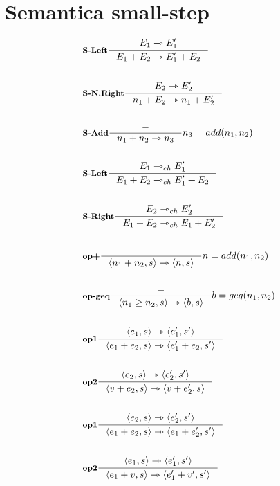 \documentclass[a4paper, 10pt]{article}
\newcommand{\infer}[4]{\inference[\textbf{#1}]{#2}{#3}#4 \\}
\newcommand{\srule}[2]{\langle #1 \rangle \rightarrowtriangle \langle #2 \rangle}
\newcommand{\goesto}{\rightarrowtriangle}
\begin{document}
\section*{Semantica small-step}
\begin{multicols}{2}
	\begin{align*}
		&\infer{S-Left}{E_1 \goesto E_1' }{E_1 + E_2 \goesto E_1' + E_2}{} \\
		&\infer{S-N.Right}{E_2 \goesto E_2'}{n_1 + E_2 \goesto n_1 + E_2'}{} \\
		&\infer{S-Add}{-}{n_1+n_2 \goesto n_3}{n_3 = add(n_1, n_2)} \\
		&\infer{S-Left}{E_1 \goesto_{ch} E_1'}{E_1 + E_2 \goesto_{ch} E_1' + E_2}{}\\
		&\infer{S-Right}{E_2 \goesto_{ch} E_2'}{E_1 + E_2 \goesto_{ch} E_1 + E_2'}{}\\
		&\infer{op+}{-}{\srule{n_1 + n_2,s}{n,s}}{n=add(n_1,n_2)}\\
		&\infer{op-geq}{-}{\srule{n_1 \geq n_2,s}{b,s}}{b=geq(n_1, n_2)} \\
		&\infer{op1}{\srule{e_1,s}{e_1', s'}}{\srule{e_1 + e_2,s}{e_1' + e_2,s'}}{} \\
		&\infer{op2}{\srule{e_2,s}{e_2', s'}}{\srule{v + e_2,s}{v + e_2',s}}{} \\
		&\infer{op1}{\srule{e_2,s}{e_2', s'}}{\srule{e_1 + e_2,s}{e_1 + e_2',s'}}{} \\
		&\infer{op2}{\srule{e_1,s}{e_1', s'}}{\srule{e_1 + v,s}{e_1' + v',s'}}{} \\
	\end{align*}
\end{multicols}
\end{document}
